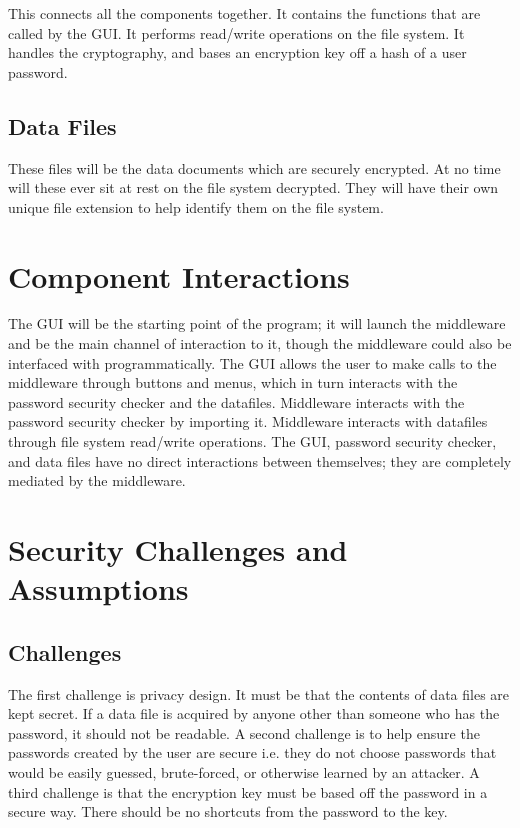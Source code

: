 \documentclass[12pt, letterpaper]{article}
\begin{document}
This connects all the components together. It contains the functions that are called by the GUI. It performs read/write operations on the file system. It handles the cryptography, and bases an encryption key off a hash of a user password.

\subsection{Data Files}

These files will be the data documents which are securely encrypted. At no time will these ever sit at rest on the file system decrypted. They will have their own unique file extension to help identify them on the file system.

\section{Component Interactions}

The GUI will be the starting point of the program; it will launch the middleware and be the main channel of interaction to it, though the middleware could also be interfaced with programmatically. The GUI allows the user to make calls to the middleware through buttons and menus, which in turn interacts with the password security checker and the datafiles. Middleware interacts with the password security checker by importing it. Middleware interacts with datafiles through file system read/write operations.
The GUI, password security checker, and data files have no direct interactions between themselves; they are completely mediated by the middleware.

\section{Security Challenges and Assumptions}

\subsection{Challenges}
The first challenge is privacy design. It must be that the contents of data files are kept secret. If a data file is acquired by anyone other than someone who has the password, it should not be readable. A second challenge is to help ensure the passwords created by the user are secure i.e. they do not choose passwords that would be easily guessed, brute-forced, or otherwise learned by an attacker. A third challenge is that the encryption key must be based off the password in a secure way. There should be no shortcuts from the password to the key.
\end{document}
